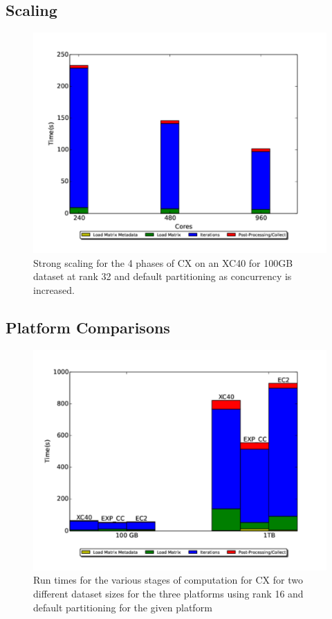   \subsection{Scaling}
    \begin{figure} [H]
    \begin{centering}
    \includegraphics[scale=0.4]{images/CX_Strong_Scaling_32_Partitions_default.pdf}
    \end{centering}
    \caption{ Strong scaling for the 4 phases of CX on an XC40 for 100GB dataset at rank 32 and default partitioning as concurrency is increased.} 
    \end{figure} 


  \subsection{Platform Comparisons}
    
    \begin{figure} [H]
    \begin{centering}
    \includegraphics[scale=0.4]{images/CX_Size_Scaling_Rank_16_Partitions_default.pdf}
    \end{centering}
    \caption{ Run times for the various stages of computation for CX for two different dataset sizes for the three platforms using rank 16 and default partitioning for the given platform} 
    \label{fig:h2hrank16} 
    \end{figure}
    
